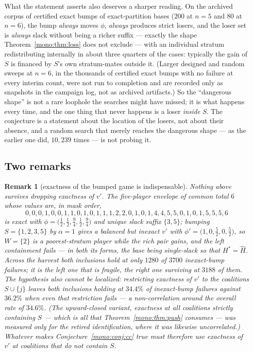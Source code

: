 \documentclass[11pt]{article}
\newtheorem{remark}[theorem]{Remark}
\begin{document}
What the statement asserts also deserves a sharper reading.  On the
archived corpus of certified
exact bumps of exact-partition bases ($200$ at $n=5$ and $80$ at $n=6$),
the bump
\emph{always} moves $\phi$, \emph{always} produces strict losers, and the
loser set is \emph{always} slack without being a richer suffix --- exactly
the shape Theorem~\ref{mono:thm:loss} does not exclude --- with an
individual stratum redistributing internally in about three quarters of
the cases: typically the gain of $S$ is financed by $S$'s own
stratum-mates outside it.  (Larger designed and random sweeps at $n=6$,
in the thousands of certified exact bumps with no failure at every
interim count, were not run to completion and are recorded only as
snapshots in the campaign log, not as archived artifacts.)  So the ``dangerous shape'' is not a rare
loophole the searches might have missed; it is what happens every time,
and the one thing that never happens is a loser \emph{inside} $S$.  The
conjecture is a statement about the location of the losers, not about
their absence, and a random search that merely reaches the dangerous
shape --- as the earlier one did, $10{,}239$ times --- is not probing it.

\subsection{Two remarks}

\begin{remark}[exactness of the bumped game is indispensable]
\label{mono:rem:exact}
Nothing above survives dropping exactness of $v'$.  The five-player envelope
of common total $6$ whose values are, in mask order,
\[
 0,0,0,1,0,0,1,1,0,1,0,1,1,1,2,2,0,1,0,1,4,4,5,5,0,1,0,1,5,5,5,6
\]
is exact with $\phi=\bigl(\tfrac12,\tfrac12,\tfrac94,\tfrac12,\tfrac94\bigr)$
and unique slack suffix $\{3,5\}$; bumping $S=\{1,2,3,5\}$ by $\alpha=1$
gives a balanced but inexact $v'$ with
$\phi'=\bigl(1,0,\tfrac52,0,\tfrac52\bigr)$, so $W=\{2\}$ is a poorest-stratum
player while the rich pair gains, and the left containment fails --- in both
its forms, the base being single-slack so that $H^*=\widehat H$.  Across the harvest both inclusions hold
at only $1280$ of $3700$ inexact-bump failures; it is the left one that is
fragile, the right one surviving at $3188$ of them.  The hypothesis also
cannot be localized: restricting exactness of $v'$ to the coalitions
$S\cup\{j\}$ leaves both inclusions holding at $34.4\%$ of inexact-bump
failures against $36.2\%$ when even that restriction fails --- a
non-correlation around the overall rate of $34.6\%$.  (The upward-closed
variant, exactness at all coalitions strictly containing $S$ --- which is
all that Theorem~\ref{mono:thm:push} consumes --- was measured only for the
retired identification, where it was likewise uncorrelated.)  Whatever makes
Conjecture~\ref{mono:conj:cc} true must therefore use exactness of $v'$ at
coalitions that do \emph{not} contain $S$.
\end{remark}
\end{document}
